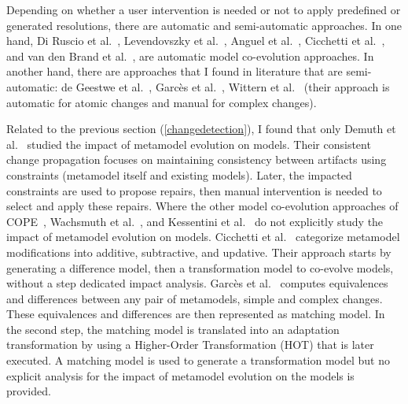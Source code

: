 Depending on whether a user intervention is needed or not to apply predefined or generated resolutions, there are automatic and semi-automatic approaches.
In one hand, Di Ruscio et al.~\cite{10.1007/978-3-642-33654-62}, Levendovszky et al.~\cite{levendovszky2014semi}, Anguel et al.~\cite{anguel2013towards,anguel2014using}, Cicchetti et al.~\cite{cicchetti2008automating}, and van den Brand et al.~\cite{van2011generic}, are automatic model co-evolution approaches.
In another hand, there are approaches that I found in literature that are semi-automatic: de Geestwe et al.~\cite{de2008generating}, Garcès et al.~\cite{garces2014adapting}, Wittern et al.~\cite{wittern2013determining} (their approach is automatic for atomic changes and manual for complex changes).

Related to the previous section (\ref{changedetection}), I found that only Demuth et al.~\cite{demuth2016co} studied the impact of metamodel evolution on models. Their consistent change propagation focuses on maintaining consistency between artifacts using constraints (metamodel itself and existing models). Later, the impacted constraints are used to propose repairs, then manual intervention is needed to select and apply these repairs. Where the other model co-evolution approaches of COPE~\cite{herrmannsdoerfer2009cope}, Wachsmuth et al.~\cite{wachsmuth2007metamodel}, and Kessentini et al.~\cite{kessentini2018integrating,kessentini2020interactive} do not explicitly study the impact of metamodel evolution on models. Cicchetti et al.~\cite{cicchetti2008automating} categorize metamodel modifications  into additive, subtractive, and updative. Their approach starts by generating a difference model, then a transformation model to co-evolve models, without a step dedicated impact analysis.
Garcès et al.~\cite{garces2009managing} computes equivalences and differences between any pair of metamodels, simple and complex changes. These equivalences and differences are then represented as matching model. In the second step, the matching model is translated into an adaptation transformation by using a Higher-Order Transformation (HOT) that is later executed. A matching model is used to generate a transformation model but no explicit analysis for the impact of metamodel evolution on the models is provided.



